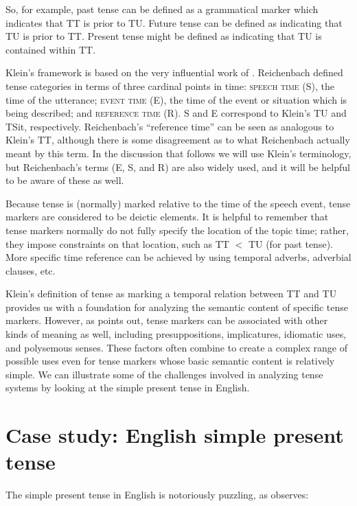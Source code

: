 So, for example, past tense can be defined as a grammatical marker which indicates that TT is prior to TU. Future tense can be defined as indicating that TU is prior to TT. Present tense might be defined as indicating that TU is contained within TT.

Klein’s framework is based on the very influential work of \citet{Reichenbach1947}. Reichenbach defined tense categories in terms of three cardinal points in time: \textsc{speech time} (S), the time of the utterance; \textsc{event time} (E), the time of the event or situation which is being described; and \textsc{reference time} (R). S and E correspond to Klein’s TU and TSit, respectively. Reichenbach’s “reference time” can be seen as analogous to Klein’s TT, although there is some disagreement as to what Reichenbach actually meant by this term. In the discussion that follows we will use Klein’s terminology, but Reichenbach’s terms (E, S, and R) are also widely used, and it will be helpful to be aware of these as well.

Because tense is (normally) marked relative to the time of the speech event, tense markers are considered to be deictic elements. It is helpful to remember that tense markers normally do not fully specify the location of the topic time; rather, they impose constraints on that location, such as TT {$<$} TU (for past tense). More specific time reference can be achieved by using temporal adverbs, adverbial clauses, etc.



Klein’s definition of tense as marking a temporal relation between TT and TU provides us with a foundation for analyzing the semantic content of specific tense markers. However, as \citet[26--29, 54--55]{Comrie1985} points out, tense markers can be associated with other kinds of meaning as well, including presuppositions, implicatures, idiomatic uses, and polysemous senses. These factors often combine to create a complex range of possible uses even for tense markers whose basic semantic content is relatively simple. We can illustrate some of the challenges involved in analyzing tense systems by looking at the simple present tense in English.


\section{Case study: English simple present tense}\label{sec:21.3}\largerpage

The simple present tense in English is notoriously puzzling, as \citet{Langacker2001} observes:


